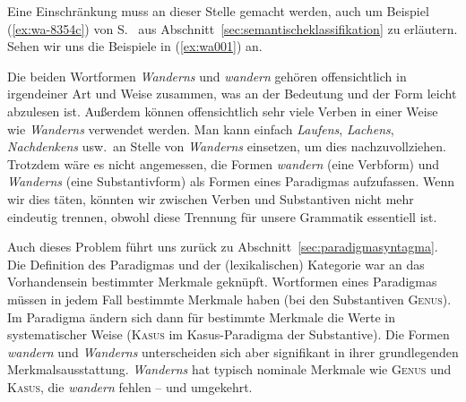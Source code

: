 
Eine Einschränkung muss an dieser Stelle gemacht werden, auch um Beispiel (\ref{ex:wa-8354c}) von S.~\pageref{ex:wa-8354c} aus Abschnitt~\ref{sec:semantischeklassifikation} zu erläutern.
Sehen wir uns die Beispiele in (\ref{ex:wa001}) an.

\begin{exe}
  \ex\label{ex:wa001}\begin{xlist}
  \end{xlist}
\end{exe}

Die beiden Wortformen \textit{Wanderns} und \textit{wandern} gehören offensichtlich in irgendeiner Art und Weise zusammen, was an der Bedeutung und der Form leicht abzulesen ist.
Außerdem können offensichtlich sehr viele Verben in einer Weise wie \textit{Wanderns} verwendet werden.
Man kann einfach \textit{Laufens}, \textit{Lachens}, \textit{Nachdenkens} usw.\ an Stelle von \textit{Wanderns} einsetzen, um dies nachzuvollziehen.
Trotzdem wäre es nicht angemessen, die Formen \textit{wandern} (eine Verbform) und \textit{Wanderns} (eine Substantivform) als Formen eines Paradigmas aufzufassen.
Wenn wir dies täten, könnten wir zwischen Verben und Substantiven nicht mehr eindeutig trennen, obwohl diese Trennung für unsere Grammatik essentiell ist.

Auch dieses Problem führt uns zurück zu Abschnitt~\ref{sec:paradigmasyntagma}.
Die Definition des Paradigmas und der (lexikalischen) Kategorie war an das Vorhandensein bestimmter Merkmale geknüpft.
Wortformen eines Paradigmas müssen in jedem Fall bestimmte Merkmale haben (bei den Substantiven \zB \textsc{Genus}).
Im Paradigma ändern sich dann für bestimmte Merkmale die Werte in systematischer Weise (\zB \textsc{Kasus} im Kasus-Paradigma der Substantive).
Die Formen \textit{wandern} und \textit{Wanderns} unterscheiden sich aber signifikant in ihrer grundlegenden Merkmalsausstattung.
\textit{Wanderns} hat typisch nominale Merkmale wie \textsc{Genus} und \textsc{Kasus}, die \textit{wandern} fehlen -- und umgekehrt.

\begin{exe}
\end{exe}

